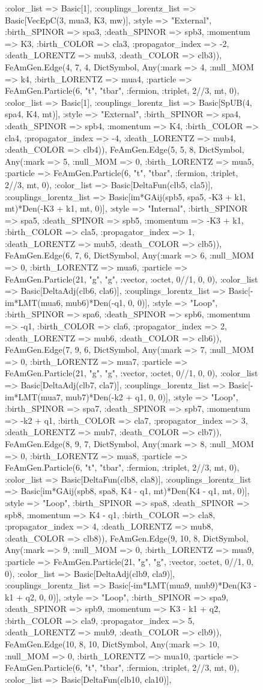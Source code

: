 \documentclass{revtex4}
\begin{document}
\begin{figure}[!htb]
\begin{center}
{:color_list => Basic[1], :couplings_lorentz_list => Basic[VecEpC(3, mua3, K3, mw)], :style => "External", :birth_SPINOR => spa3, :death_SPINOR => spb3, :momentum => K3, :birth_COLOR => cla3, :propagator_index => -2, :death_LORENTZ => mub3, :death_COLOR => clb3)), FeAmGen.Edge(4, 7, 4, Dict{Symbol, Any}(:mark => 4, :null_MOM => k4, :birth_LORENTZ => mua4, :particle => FeAmGen.Particle(6, "t", "tbar", :fermion, :triplet, 2//3, mt, 0), :color_list => Basic[1], :couplings_lorentz_list => Basic[SpUB(4, spa4, K4, mt)], :style => "External", :birth_SPINOR => spa4, :death_SPINOR => spb4, :momentum => K4, :birth_COLOR => cla4, :propagator_index => -4, :death_LORENTZ => mub4, :death_COLOR => clb4)), FeAmGen.Edge(5, 5, 8, Dict{Symbol, Any}(:mark => 5, :null_MOM => 0, :birth_LORENTZ => mua5, :particle => FeAmGen.Particle(6, "t", "tbar", :fermion, :triplet, 2//3, mt, 0), :color_list => Basic[DeltaFun(clb5, cla5)], :couplings_lorentz_list => Basic[im*GAij(spb5, spa5, -K3 + k1, mt)*Den(-K3 + k1, mt, 0)], :style => "Internal", :birth_SPINOR => spa5, :death_SPINOR => spb5, :momentum => -K3 + k1, :birth_COLOR => cla5, :propagator_index => 1, :death_LORENTZ => mub5, :death_COLOR => clb5)), FeAmGen.Edge(6, 7, 6, Dict{Symbol, Any}(:mark => 6, :null_MOM => 0, :birth_LORENTZ => mua6, :particle => FeAmGen.Particle(21, "g", "g", :vector, :octet, 0//1, 0, 0), :color_list => Basic[DeltaAdj(clb6, cla6)], :couplings_lorentz_list => Basic[-im*LMT(mua6, mub6)*Den(-q1, 0, 0)], :style => "Loop", :birth_SPINOR => spa6, :death_SPINOR => spb6, :momentum => -q1, :birth_COLOR => cla6, :propagator_index => 2, :death_LORENTZ => mub6, :death_COLOR => clb6)), FeAmGen.Edge(7, 9, 6, Dict{Symbol, Any}(:mark => 7, :null_MOM => 0, :birth_LORENTZ => mua7, :particle => FeAmGen.Particle(21, "g", "g", :vector, :octet, 0//1, 0, 0), :color_list => Basic[DeltaAdj(clb7, cla7)], :couplings_lorentz_list => Basic[-im*LMT(mua7, mub7)*Den(-k2 + q1, 0, 0)], :style => "Loop", :birth_SPINOR => spa7, :death_SPINOR => spb7, :momentum => -k2 + q1, :birth_COLOR => cla7, :propagator_index => 3, :death_LORENTZ => mub7, :death_COLOR => clb7)), FeAmGen.Edge(8, 9, 7, Dict{Symbol, Any}(:mark => 8, :null_MOM => 0, :birth_LORENTZ => mua8, :particle => FeAmGen.Particle(6, "t", "tbar", :fermion, :triplet, 2//3, mt, 0), :color_list => Basic[DeltaFun(clb8, cla8)], :couplings_lorentz_list => Basic[im*GAij(spb8, spa8, K4 - q1, mt)*Den(K4 - q1, mt, 0)], :style => "Loop", :birth_SPINOR => spa8, :death_SPINOR => spb8, :momentum => K4 - q1, :birth_COLOR => cla8, :propagator_index => 4, :death_LORENTZ => mub8, :death_COLOR => clb8)), FeAmGen.Edge(9, 10, 8, Dict{Symbol, Any}(:mark => 9, :null_MOM => 0, :birth_LORENTZ => mua9, :particle => FeAmGen.Particle(21, "g", "g", :vector, :octet, 0//1, 0, 0), :color_list => Basic[DeltaAdj(clb9, cla9)], :couplings_lorentz_list => Basic[-im*LMT(mua9, mub9)*Den(K3 - k1 + q2, 0, 0)], :style => "Loop", :birth_SPINOR => spa9, :death_SPINOR => spb9, :momentum => K3 - k1 + q2, :birth_COLOR => cla9, :propagator_index => 5, :death_LORENTZ => mub9, :death_COLOR => clb9)), FeAmGen.Edge(10, 8, 10, Dict{Symbol, Any}(:mark => 10, :null_MOM => 0, :birth_LORENTZ => mua10, :particle => FeAmGen.Particle(6, "t", "tbar", :fermion, :triplet, 2//3, mt, 0), :color_list => Basic[DeltaFun(clb10, cla10)], }
\end{center}
\end{figure}
\end{document}
